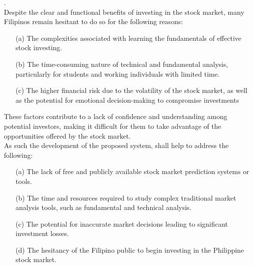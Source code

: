 \cite{Statista2022,POPCOMM2021}.
\vspace{0.5cm}
\\Despite the clear and functional benefits of investing in the stock market, 
many Filipinos remain hesitant to do so for the following reasons:
\begin{itemize}
  \item[(a)] The complexities associated with learning the fundamentals 
  of effective stock investing.
  \item[(b)] The time-consuming nature of technical and fundamental 
  analysis, particularly for students and working individuals with limited time.
  \item[(c)] The higher financial risk due to the volatility of the stock market, 
  as well as the potential for emotional decision-making to compromise investments
\end{itemize}
These factors contribute to a lack of confidence and understanding 
among potential investors, making it difficult for them to take advantage of the 
opportunities offered by the stock market.
\vspace{0.5cm}
\\As such the development of the proposed system, shall help to address the following:
\begin{itemize}
  \item[(a)] The lack of free and publicly available 
  stock market prediction systems or tools.
  \item[(b)] The time and resources required to study complex traditional 
  market analysis tools, such as fundamental and technical analysis.
  \item[(c)] The potential for inaccurate market decisions
  leading to significant investment losses.
  \item[(d)] The hesitancy of the Filipino public to begin 
  investing in the Philippine stock market.
\end{itemize}
